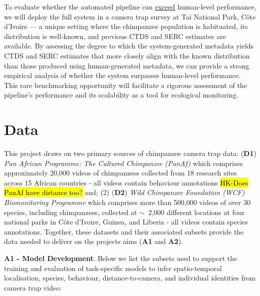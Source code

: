 \begin{enumerate}[label=\textbf{WS\arabic*:}]
            To evaluate whether the automated pipeline can \underline{exceed} human-level performance, we will deploy the full system in a camera trap survey at Tai National Park, Côte d’Ivoire — a unique setting where the chimpanzee population is habituated, its distribution is well-known, and previous CTDS and SERC estimates are available. By assessing the degree to which the system-generated metadata yields CTDS and SERC estimates that more closely align with the known distribution than those produced using human-generated metadata, we can provide a strong empirical analysis of whether the system surpasses human-level performance. This rare benchmarking opportunity will facilitate a rigorous assessment of the pipeline’s performance and its scalability as a tool for ecological monitoring.

\end{enumerate}

\section{Data}

This project draws on two primary sources of chimpanzee camera trap data: (\textbf{D1}) \textit{Pan African Programme: The Cultured Chimpanzee (PanAf)} which comprises approximately 20,000 videos of chimpanzees collected from 18 research sites across 15 African countries - all videos contain behaviour annotations \hl{HK-Does PanAf have distance too?}%
and; (2) (\textbf{D2}) \textit{Wild Chimpanzee Foundation (WCF) Biomonitoring Programme} which comprises more than 500,000 videos of over 30 species, including chimpanzees, collected at $\sim$~2,000 different locations at four national parks in Côte d’Ivoire, Guinea, and Liberia - all videos contain species annotations. %
Together, these datasets and their associated subsets provide the data needed to deliver on the projects aims (\textbf{A1} and \textbf{A2}).

\textbf{A1 - Model Development}. Below we list the subsets used to support the training and evaluation of task-specific models to infer spatio-temporal localisation, species, behaviour, distance-to-camera, and individual identities from camera trap video:


